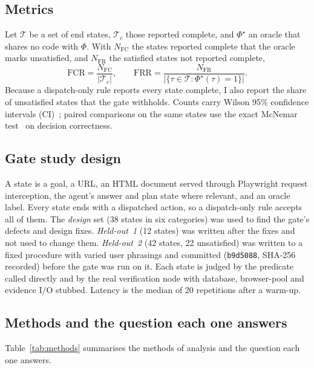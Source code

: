 \subsection{Metrics}
Let $\mathcal{T}$ be a set of end states, $\mathcal{T}_c$ those reported complete, and $\Phi^{\star}$ an oracle that shares no code with $\Phi$. With $N_{\mathrm{FC}}$ the states reported complete that the oracle marks unsatisfied, and $N_{\mathrm{FR}}$ the satisfied states not reported complete,
\begin{equation}
\mathrm{FCR} = \frac{N_{\mathrm{FC}}}{\lvert\mathcal{T}_c\rvert}, \qquad
\mathrm{FRR} = \frac{N_{\mathrm{FR}}}{\lvert\{\tau\in\mathcal{T}:\Phi^{\star}(\tau)=1\}\rvert}.
\label{eq:fcr}
\end{equation}
Because a dispatch-only rule reports every state complete, I also report the share of unsatisfied states that the gate withholds. Counts carry Wilson 95\% confidence intervals (CI)~\cite{wilson1927probable}; paired comparisons on the same states use the exact McNemar test~\cite{mcnemar1947note} on decision correctness.

\subsection{Gate study design}
A state is a goal, a URL, an HTML document served through Playwright request interception, the agent's answer and plan state where relevant, and an oracle label. Every state ends with a dispatched action, so a dispatch-only rule accepts all of them. The \emph{design} set (38 states in six categories) was used to find the gate's defects and design fixes. \emph{Held-out~1} (12 states) was written after the fixes and not used to change them. \emph{Held-out~2} (42 states, 22 unsatisfied) was written to a fixed procedure with varied user phrasings and committed (\texttt{b9d5088}, SHA-256 recorded) before the gate was run on it. Each state is judged by the predicate called directly and by the real verification node with database, browser-pool and evidence I/O stubbed. Latency is the median of 20 repetitions after a warm-up.

\subsection{Methods and the question each one answers}
Table~\ref{tab:methods} summarises the methods of analysis and the question each one answers.

